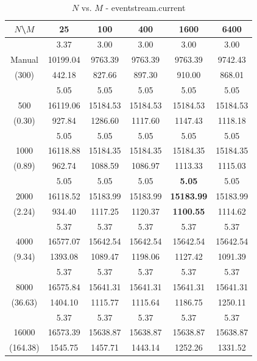 \begin{table}[th]
\caption{$N$ vs. $M$ - eventstream.current}
\label{tab:eventstream.current}
\centering
\begin{tabular}{|c||c|c|c|c|c|}
\hline
$N$\textbackslash $M$& 25 & 100 & 400 & 1600 & 6400 \\ \hline \hline
       & 3.37     & 3.00    & 3.00    & 3.00    & 3.00 \\ 
Manual & 10199.04 & 9763.39 & 9763.39 & 9763.39 & 9742.43 \\
(300) & 442.18  & 827.66  & 897.30 & 910.00 & 868.01 \\ \hline
     & 5.05 & 5.05 & 5.05 & 5.05 & 5.05\\
500  & 16119.06 & 15184.53 & 15184.53 & 15184.53 & 15184.53\\ 
(0.30)  & 927.84 & 1286.60 & 1117.60 & 1147.43 & 1118.18\\ \hline 
  & 5.05 & 5.05 & 5.05 & 5.05 & 5.05\\ 
1000  & 16118.88 & 15184.35 & 15184.35 & 15184.35 & 15184.35\\ 
(0.89)  & 962.74 & 1088.59 & 1086.97 & 1113.33 & 1115.03\\ \hline 
  & 5.05 & 5.05 & 5.05 & {\bf 5.05} & 5.05\\ 
2000  & 16118.52 & 15183.99 & 15183.99 & {\bf 15183.99} & 15183.99\\ 
(2.24)  & 934.40 & 1117.25 & 1120.37 & {\bf 1100.55} & 1114.62\\ \hline 
  & 5.37 & 5.37 & 5.37 & 5.37 & 5.37\\ 
4000  & 16577.07 & 15642.54 & 15642.54 & 15642.54 & 15642.54\\ 
(9.34)  & 1393.08 & 1089.47 & 1198.06 & 1127.42 & 1091.39\\ \hline 
  & 5.37 & 5.37 & 5.37 & 5.37 & 5.37\\ 
8000  & 16575.84 & 15641.31 & 15641.31 & 15641.31 & 15641.31\\ 
(36.63)  & 1404.10 & 1115.77 & 1115.64 & 1186.75 & 1250.11\\ \hline 
  & 5.37 & 5.37 & 5.37 & 5.37 & 5.37\\ 
16000  & 16573.39 & 15638.87 & 15638.87 & 15638.87 & 15638.87\\ 
(164.38)  & 1545.75 & 1457.71 & 1443.14 & 1252.26 & 1331.52\\ \hline 
\end{tabular}
\end{table}
